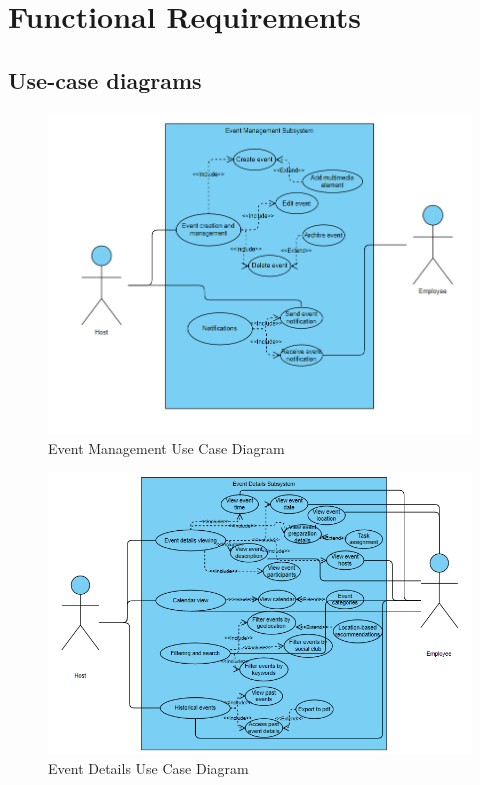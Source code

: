 \documentclass[a4paper,12pt]{article}
\begin{document}
\section{Functional Requirements}
\label{sec:functional-requirements}

\subsection{Use-case diagrams}
\label{sec:use-case-diagram}
\begin{figure}[H]
    \centering
    \includegraphics[width=\textwidth]{EventManagementSubsystem.png}
    \caption{Event Management Use Case Diagram}
    \label{fig:use-case-diagram}
\end{figure}

\begin{figure}[H]
    \centering
    \includegraphics[width=\textwidth]{EventDetailsSubsystem.png}
    \caption{Event Details Use Case Diagram}
    \label{fig:use-case-diagram}
\end{figure}
\end{document}
